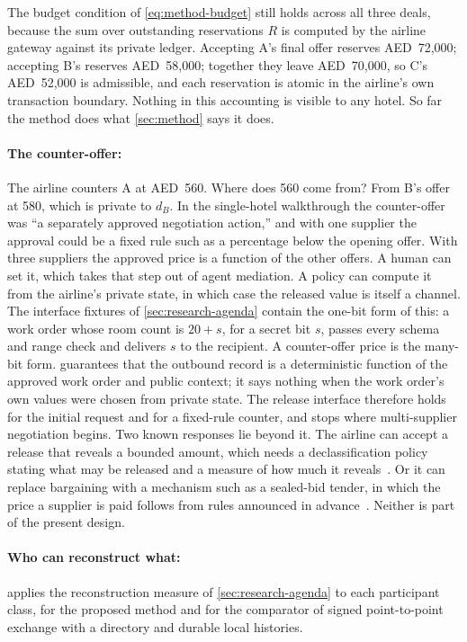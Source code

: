 The budget condition of \cref{eq:method-budget} still holds across all three deals, because the sum over outstanding reservations $R$ is computed by the airline gateway against its private ledger. Accepting A's final offer reserves AED~72,000; accepting B's reserves AED~58,000; together they leave AED~70,000, so C's AED~52,000 is admissible, and each reservation is atomic in the airline's own transaction boundary. Nothing in this accounting is visible to any hotel. So far the method does what \cref{sec:method} says it does.

\paragraph{The counter-offer:} The airline counters A at AED~560. Where does 560 come from? From B's offer at 580, which is private to $d_B$. In the single-hotel walkthrough the counter-offer was ``a separately approved negotiation action,'' and with one supplier the approval could be a fixed rule such as a percentage below the opening offer. With three suppliers the approved price is a function of the other offers. A human can set it, which takes that step out of agent mediation. A policy can compute it from the airline's private state, in which case the released value is itself a channel. The interface fixtures of \cref{sec:research-agenda} contain the one-bit form of this: a work order whose room count is $20+s$, for a secret bit $s$, passes every schema and range check and delivers $s$ to the recipient. A counter-offer price is the many-bit form.  guarantees that the outbound record is a deterministic function of the approved work order and public context; it says nothing when the work order's own values were chosen from private state. The release interface therefore holds for the initial request and for a fixed-rule counter, and stops where multi-supplier negotiation begins. Two known responses lie beyond it. The airline can accept a release that reveals a bounded amount, which needs a declassification policy stating what may be released and a measure of how much it reveals~\citep{sabelfeld2009declassification,smith2009qif}. Or it can replace bargaining with a mechanism such as a sealed-bid tender, in which the price a supplier is paid follows from rules announced in advance~\citep{vickrey1961}. Neither is part of the present design.

\paragraph{Who can reconstruct what:}  applies the reconstruction measure of \cref{sec:research-agenda} to each participant class, for the proposed method and for the comparator of signed point-to-point exchange with a directory and durable local histories.

